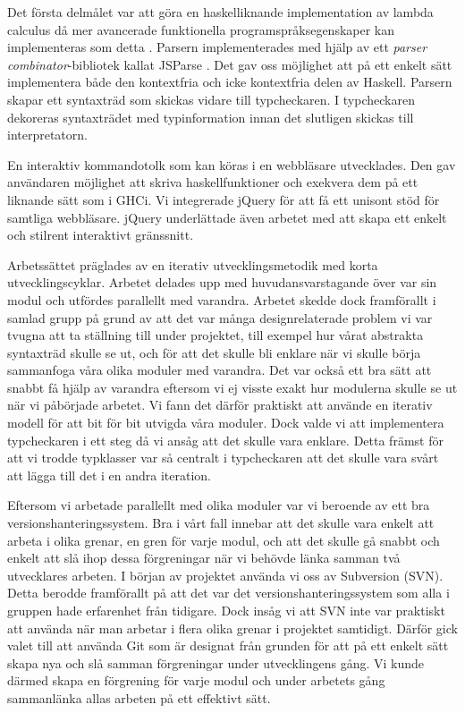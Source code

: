 Det första delmålet var att göra en haskelliknande implementation av lambda calculus då mer avancerade funktionella programspråksegenskaper kan implementeras som detta \citep{jones87}.
Parsern implementerades med hjälp av ett \emph{parser combinator}-bibliotek kallat JSParse \citep{jsparse}. Det gav oss möjlighet att på ett enkelt sätt implementera både den kontextfria och icke kontextfria delen av Haskell. Parsern skapar ett syntaxträd som skickas vidare till typcheckaren. I typcheckaren dekoreras syntaxträdet med typinformation innan det slutligen skickas till interpretatorn.

En interaktiv kommandotolk som kan köras i en webbläsare utvecklades. Den gav användaren möjlighet att skriva haskellfunktioner och exekvera dem på ett liknande sätt som i GHCi. 
Vi integrerade jQuery \citep{jquery} för att få ett unisont stöd för samtliga webbläsare. jQuery underlättade även arbetet med att skapa ett enkelt och stilrent interaktivt gränssnitt.

Arbetssättet präglades av en iterativ utvecklingsmetodik med korta utvecklingscyklar. Arbetet delades upp med huvudansvarstagande över var sin modul och utfördes parallellt med varandra. Arbetet skedde dock framförallt i samlad grupp på grund av att det var många designrelaterade problem vi var tvugna att ta ställning till under projektet, till exempel hur vårat abstrakta syntaxträd skulle se ut, och för att det skulle bli enklare när vi skulle börja sammanfoga våra olika moduler med varandra. 
Det var också ett bra sätt att snabbt få hjälp av varandra eftersom vi ej visste exakt hur modulerna skulle se ut när vi påbörjade arbetet. Vi fann det därför praktiskt att använde en iterativ modell för att bit för bit utvigda våra moduler. Dock valde vi att implementera typcheckaren i ett steg då vi ansåg att det skulle vara enklare. Detta främst för att vi trodde typklasser var så centralt i typcheckaren att det skulle vara svårt att lägga till det i en andra iteration. 

Eftersom vi arbetade parallellt med olika moduler var vi beroende av ett bra versionshanteringssystem. Bra i vårt fall innebar att det skulle vara enkelt att arbeta i olika grenar, en gren för varje modul, och att det skulle gå snabbt och enkelt att slå ihop dessa förgreningar när vi behövde länka samman två utvecklares arbeten. I början av projektet använda vi oss av Subversion (SVN). Detta berodde framförallt på att det var det versionshanteringssystem som alla i gruppen hade erfarenhet från tidigare. Dock insåg vi att SVN inte var praktiskt att använda när man arbetar i flera olika grenar i projektet samtidigt. Därför gick valet till att använda Git som är designat från grunden för att på ett enkelt sätt skapa nya och slå samman förgreningar under utvecklingens gång. Vi kunde därmed skapa en förgrening för varje modul och under arbetets gång sammanlänka allas arbeten på ett effektivt sätt. 

